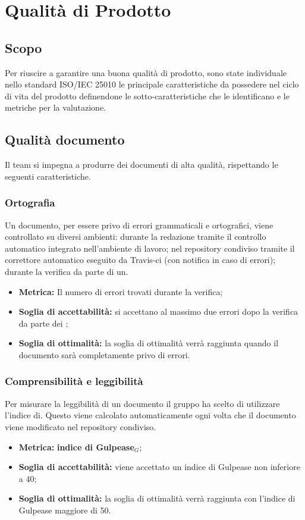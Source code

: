 \chapter{Qualità di Prodotto}
\label{prodotto}
\section{Scopo}
Per riuscire a garantire una buona qualità di prodotto, sono state individuale nello
standard ISO/IEC 25010 le principale caratteristiche da possedere nel ciclo di vita del prodotto definendone le sotto-caratteristiche che le identificano e le metriche per la valutazione.

\section{Qualità documento}
\label{documento}
Il team si impegna a produrre dei documenti di alta qualità, rispettando le seguenti caratteristiche.
\subsection{Ortografia}
Un documento, per essere privo di errori grammaticali e ortografici, viene controllato su diversi ambienti: durante la redazione tramite il controllo automatico integrato nell'ambiente di lavoro; nel repository condiviso tramite il correttore automatico eseguito da Travis-ci (con notifica in caso di errori); durante la verifica da parte di un.
\begin{itemize}
    \item \textbf{Metrica:} Il numero di errori trovati durante la verifica;
    \item \textbf{Soglia di accettabilità:} si accettano al massimo due errori dopo la verifica da parte dei ;
    \item \textbf{Soglia di ottimalità:} la soglia di ottimalità verrà raggiunta quando il documento sarà completamente privo di errori.
\end{itemize}
\subsection{Comprensibilità e leggibilità}
Per misurare la leggibilità di un documento il gruppo ha scelto di utilizzare l'indice di. Questo viene calcolato automaticamente ogni volta che il documento viene modificato nel repository condiviso.
\begin{itemize}
    \item \textbf{Metrica:} \textbf{indice di Gulpease$_{G}$};
    \item \textbf{Soglia di accettabilità:} viene accettato un indice di Gulpease non inferiore a 40;
    \item \textbf{Soglia di ottimalità:} la soglia di ottimalità verrà raggiunta con l'indice di Gulpease maggiore di 50.
\end{itemize}
